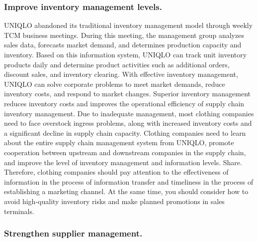 \documentclass[12pt,]{article}
\begin{document}
\hypertarget{improve-inventory-management-levels.}{%
\subsubsection{Improve inventory management
levels.}\label{improve-inventory-management-levels.}}

UNIQLO abandoned its traditional inventory management model through
weekly TCM business meetings. During this meeting, the management group
analyzes sales data, forecasts market demand, and determines production
capacity and inventory. Based on this information system, UNIQLO can
track unit inventory products daily and determine product activities
such as additional orders, discount sales, and inventory clearing. With
effective inventory management, UNIQLO can solve corporate problems to
meet market demands, reduce inventory costs, and respond to market
changes. Superior inventory management reduces inventory costs and
improves the operational efficiency of supply chain inventory
management. Due to inadequate management, most clothing companies need
to face overstock ingress problems, along with increased inventory costs
and a significant decline in supply chain capacity. Clothing companies
need to learn about the entire supply chain management system from
UNIQLO, promote cooperation between upstream and downstream companies in
the supply chain, and improve the level of inventory management and
information levels. Share. Therefore, clothing companies should pay
attention to the effectiveness of information in the process of
information transfer and timeliness in the process of establishing a
marketing channel. At the same time, you should consider how to avoid
high-quality inventory risks and make planned promotions in sales
terminals.

\hypertarget{strengthen-supplier-management.}{%
\subsubsection{Strengthen supplier
management.}\label{strengthen-supplier-management.}}
\end{document}
